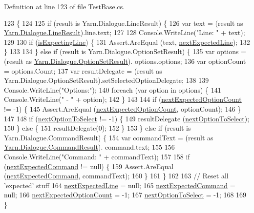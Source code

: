 Definition at line 123 of file Test\-Base.\-cs.


\begin{DoxyCode}
123                                                                        \{
124 
125             \textcolor{keywordflow}{if} (result is Yarn.Dialogue.LineResult) \{
126                 var text = (result as \hyperlink{a00122}{Yarn.Dialogue.LineResult}).line.text;
127 
128                 Console.WriteLine(\textcolor{stringliteral}{"Line: "} + text);
129 
130                 \textcolor{keywordflow}{if} (\hyperlink{a00160_a47f35b8e8123ed9471883d02b8bc9f3e}{isExpectingLine}) \{
131                     Assert.AreEqual (text, \hyperlink{a00160_a3651ffb5425ab15bd1e42749347c1ee7}{nextExpectedLine});
132                 \}
133 
134             \} \textcolor{keywordflow}{else} \textcolor{keywordflow}{if} (result is Yarn.Dialogue.OptionSetResult) \{
135                 var options = (result as \hyperlink{a00135}{Yarn.Dialogue.OptionSetResult}).
      options.options;
136                 var optionCount = options.Count;
137                 var resultDelegate = (result as Yarn.Dialogue.OptionSetResult).setSelectedOptionDelegate;
138 
139                 Console.WriteLine(\textcolor{stringliteral}{"Options:"});
140                 \textcolor{keywordflow}{foreach} (var option \textcolor{keywordflow}{in} options) \{
141                     Console.WriteLine(\textcolor{stringliteral}{" - "} + option);
142                 \}
143 
144                 \textcolor{keywordflow}{if} (\hyperlink{a00160_aaabaf15249efe42f3d857129bdbc2864}{nextExpectedOptionCount} != -1) \{
145                     Assert.AreEqual (\hyperlink{a00160_aaabaf15249efe42f3d857129bdbc2864}{nextExpectedOptionCount}, optionCount);
146                 \}
147 
148                 \textcolor{keywordflow}{if} (\hyperlink{a00160_a343055fa693e9d5dfc1bdbfcd0f02676}{nextOptionToSelect} != -1) \{
149                     resultDelegate (\hyperlink{a00160_a343055fa693e9d5dfc1bdbfcd0f02676}{nextOptionToSelect});
150                 \} \textcolor{keywordflow}{else} \{
151                     resultDelegate(0);
152                 \}
153             \} \textcolor{keywordflow}{else} \textcolor{keywordflow}{if} (result is Yarn.Dialogue.CommandResult) \{
154                 var commandText = (result as \hyperlink{a00042}{Yarn.Dialogue.CommandResult}).
      command.text;
155 
156                 Console.WriteLine(\textcolor{stringliteral}{"Command: "} + commandText);
157 
158                 \textcolor{keywordflow}{if} (\hyperlink{a00160_a26fae5694fc06c3cdb12d3108dbc34de}{nextExpectedCommand} != null) \{
159                     Assert.AreEqual (\hyperlink{a00160_a26fae5694fc06c3cdb12d3108dbc34de}{nextExpectedCommand}, commandText);
160                 \}
161             \}
162 
163             \textcolor{comment}{// Reset all 'expected' stuff}
164             \hyperlink{a00160_a3651ffb5425ab15bd1e42749347c1ee7}{nextExpectedLine} = null;
165             \hyperlink{a00160_a26fae5694fc06c3cdb12d3108dbc34de}{nextExpectedCommand} = null;
166             \hyperlink{a00160_aaabaf15249efe42f3d857129bdbc2864}{nextExpectedOptionCount} = -1;
167             \hyperlink{a00160_a343055fa693e9d5dfc1bdbfcd0f02676}{nextOptionToSelect} = -1;
168 
169         \}
\end{DoxyCode}
